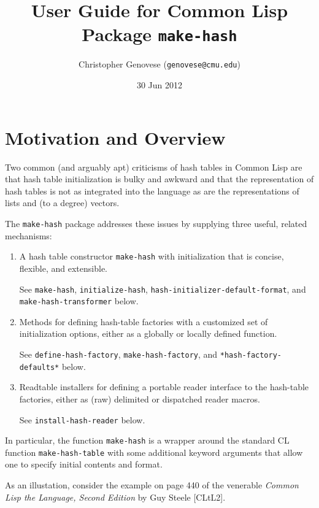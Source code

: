 \documentclass[11pt]{article}
\title{User Guide for Common Lisp Package \texttt{make-hash}}
\author{Christopher Genovese (\texttt{genovese@cmu.edu})}
\date{30 Jun 2012\vspace*{-0.5cm}}
\begin{document}
\maketitle

\setcounter{tocdepth}{3}
\tableofcontents
\vspace*{1cm}

\section{Motivation and Overview}
\label{sec-1}


  Two common (and arguably apt) criticisms of hash tables in Common Lisp are
  that hash table initialization is bulky and awkward and that the
  representation of hash tables is not as integrated into the language as are
  the representations of lists and (to a degree) vectors.

  The \texttt{make-hash} package addresses these issues by supplying three
  useful, related mechanisms:
  
\begin{enumerate}
\item A hash table constructor \texttt{make-hash} with initialization that is
       concise, flexible, and extensible.

       See \texttt{make-hash}, \texttt{initialize-hash}, \texttt{hash-initializer-default-format},
       and \texttt{make-hash-transformer} below.
\item Methods for defining hash-table factories with a customized
       set of initialization options, either as a globally or locally
       defined function.

       See \texttt{define-hash-factory}, \texttt{make-hash-factory}, and \newline
       \texttt{*hash-factory-defaults*} below.
\item Readtable installers for defining a portable reader interface to
       the hash-table factories, either as (raw) delimited or dispatched
       reader macros.
       
       See \texttt{install-hash-reader} below.
\end{enumerate}

  \noindent
  In particular, the function \texttt{make-hash} is a wrapper around the standard
  CL function \texttt{make-hash-table} with some additional keyword arguments
  that allow one to specify initial contents and format.

  As an illustation, consider the example on page 440 of the venerable
  \emph{Common Lisp the Language, Second Edition} by Guy Steele [CLtL2].
\end{document}
